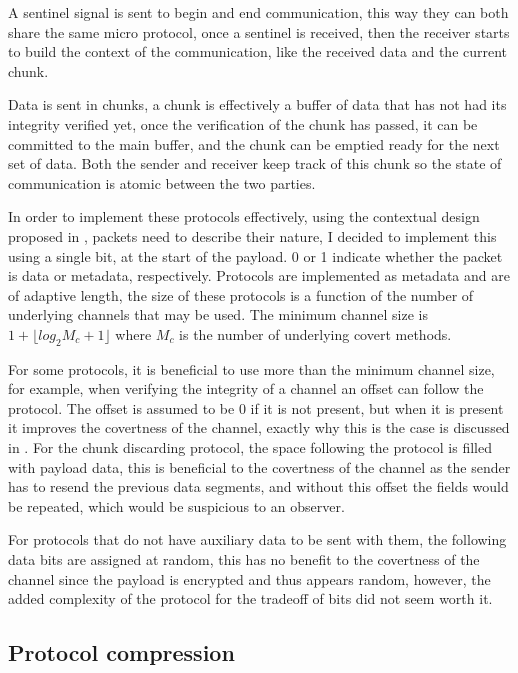 A sentinel signal is sent to begin and end communication, this way they can both share the same micro protocol, once a sentinel is received, then the receiver starts to build the context of the communication, like the received data and the current chunk.

Data is sent in chunks, a chunk is effectively a buffer of data that has not had its integrity verified yet, once the verification of the chunk has passed, it can be committed to the main buffer, and the chunk can be emptied ready for the next set of data. Both the sender and receiver keep track of this chunk so the state of communication is atomic between the two parties.

In order to implement these protocols effectively, using the contextual design proposed in \citep{rfc1144}, packets need to describe their nature, I decided to implement this using a single bit, at the start of the payload. 0 or 1 indicate whether the packet is data or metadata, respectively. Protocols are implemented as metadata and are of adaptive length, the size of these protocols is a function of the number of underlying channels that may be used. The minimum channel size is $1 + \lfloor log_2{M_c + 1} \rfloor$ where $M_c$ is the number of underlying covert methods.

For some protocols, it is beneficial to use more than the minimum channel size, for example, when verifying the integrity of a channel an offset can follow the protocol. The offset is assumed to be 0 if it is not present, but when it is present it improves the covertness of the channel, exactly why this is the case is discussed in . For the chunk discarding protocol, the space following the protocol is filled with payload data, this is beneficial to the covertness of the channel as the sender has to resend the previous data segments, and without this offset the fields would be repeated, which would be suspicious to an observer.

For protocols that do not have auxiliary data to be sent with them, the following data bits are assigned at random, this has no benefit to the covertness of the channel since the payload is encrypted and thus appears random, however, the added complexity of the protocol for the tradeoff of bits did not seem worth it.

\subsection{Protocol compression}

